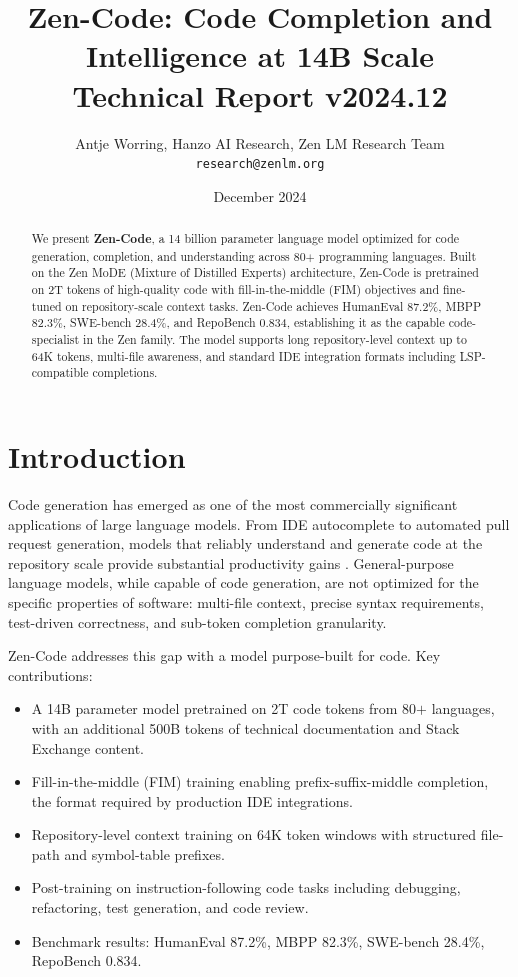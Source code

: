 \documentclass[11pt,a4paper]{article}
\title{\textbf{Zen-Code: Code Completion and Intelligence at 14B Scale}\\
\large Technical Report v2024.12}
\author{Antje Worring, Hanzo AI Research, Zen LM Research Team\\
\texttt{research@zenlm.org}}
\date{December 2024}
\begin{document}
\maketitle

\begin{abstract}
We present \textbf{Zen-Code}, a 14 billion parameter language model optimized for code
generation, completion, and understanding across 80$+$ programming languages. Built on the
Zen MoDE (Mixture of Distilled Experts) architecture, Zen-Code is pretrained on 2T tokens of
high-quality code with fill-in-the-middle (FIM) objectives and fine-tuned on repository-scale
context tasks. Zen-Code achieves HumanEval 87.2\%, MBPP 82.3\%, SWE-bench 28.4\%, and
RepoBench 0.834, establishing it as the capable code-specialist in the Zen family. The model
supports long repository-level context up to 64K tokens, multi-file awareness, and standard
IDE integration formats including LSP-compatible completions.
\end{abstract}

\tableofcontents
\newpage

\section{Introduction}

Code generation has emerged as one of the most commercially significant applications of large
language models. From IDE autocomplete to automated pull request generation, models that reliably
understand and generate code at the repository scale provide substantial productivity gains
\cite{chen2021codex, nijkamp2023codegen2}. General-purpose language models, while capable of
code generation, are not optimized for the specific properties of software: multi-file context,
precise syntax requirements, test-driven correctness, and sub-token completion granularity.

Zen-Code addresses this gap with a model purpose-built for code. Key contributions:

\begin{itemize}
  \item A 14B parameter model pretrained on 2T code tokens from 80$+$ languages, with an
        additional 500B tokens of technical documentation and Stack Exchange content.
  \item Fill-in-the-middle (FIM) training enabling prefix-suffix-middle completion, the
        format required by production IDE integrations.
  \item Repository-level context training on 64K token windows with structured file-path
        and symbol-table prefixes.
  \item Post-training on instruction-following code tasks including debugging, refactoring,
        test generation, and code review.
  \item Benchmark results: HumanEval 87.2\%, MBPP 82.3\%, SWE-bench 28.4\%, RepoBench 0.834.
\end{itemize}
\end{document}
